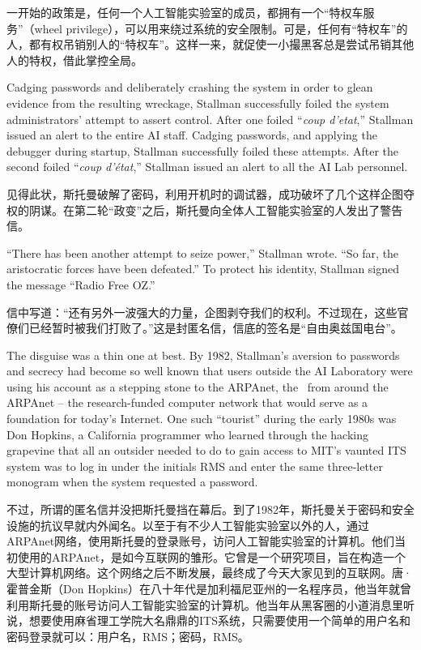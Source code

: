 \ifdefined\chs
一开始的政策是，任何一个人工智能实验室的成员，都拥有一个``特权车服务''（wheel privilege），可以用来绕过系统的安全限制。可是，任何有``特权车''的人，都有权吊销别人的``特权车''。这样一来，就促使一小撮黑客总是尝试吊销其他人的特权，借此掌控全局。
\fi
\fi

\ifdefined\eng
\ifdefined\vone
Cadging passwords and deliberately crashing the system in order to glean evidence from the resulting wreckage, Stallman successfully foiled the system administrators' attempt to assert control. After one foiled ``\textit{coup d'etat},'' Stallman issued an alert to the entire AI staff.
\fi
\ifdefined\vtwo
Cadging passwords, and applying the debugger during startup, Stallman successfully foiled these attempts. After the second foiled ``\textit{coup d'état},'' Stallman issued an alert to all the AI Lab personnel.
\fi
\fi

\ifdefined\chs
见得此状，斯托曼破解了密码，利用开机时的调试器，成功破坏了几个这样企图夺权的阴谋。在第二轮``政变''之后，斯托曼向全体人工智能实验室的人发出了警告信。
\fi

\ifdefined\eng
``There has been another attempt to seize power,'' Stallman wrote. ``So far, the aristocratic forces have been defeated.'' To protect his identity, Stallman signed the message ``Radio Free OZ.''
\fi

\ifdefined\chs
信中写道：``还有另外一波强大的力量，企图剥夺我们的权利。不过现在，这些官僚们已经暂时被我们打败了。''这是封匿名信，信底的签名是``自由奥兹国电台''。
\fi

\ifdefined\eng
The disguise was a thin one at best. By 1982, Stallman's aversion to passwords and secrecy had become so well known that users outside the AI Laboratory were using his account \ifdefined\vone as a stepping stone to the ARPAnet, the \fi\ifdefined\vtwo\ from around the ARPAnet -- the \fi research-funded computer network that would serve as a foundation for today's Internet. One such ``tourist'' during the early 1980s was Don Hopkins, a California programmer who learned through the hacking grapevine that all an outsider needed to do to gain access to MIT's vaunted ITS system was to log in under the initials RMS and enter the same three-letter monogram when the system requested a password.
\fi

\ifdefined\chs
不过，所谓的匿名信并没把斯托曼挡在幕后。到了1982年，斯托曼关于密码和安全设施的抗议早就内外闻名。以至于有不少人工智能实验室以外的人，通过ARPAnet网络，使用斯托曼的登录账号，访问人工智能实验室的计算机。他们当初使用的ARPAnet，是如今互联网的雏形。它曾是一个研究项目，旨在构造一个大型计算机网络。这个网络之后不断发展，最终成了今天大家见到的互联网。唐·霍普金斯（Don Hopkins）在八十年代是加利福尼亚州的一名程序员，他当年就曾利用斯托曼的账号访问人工智能实验室的计算机。他当年从黑客圈的小道消息里听说，想要使用麻省理工学院大名鼎鼎的ITS系统，只需要使用一个简单的用户名和密码登录就可以：用户名，RMS；密码，RMS。
\fi

